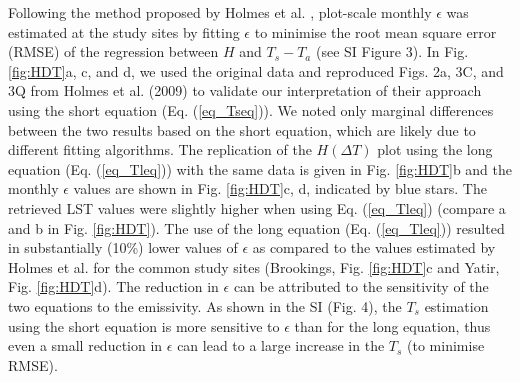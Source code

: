 \documentclass[fleqn,10pt]{wlscirep}
\begin{document}
Following the method proposed by Holmes et al. \cite{holmes2009land, holmes2016cloud}, plot-scale monthly $\epsilon$ was estimated at the study sites by fitting $\epsilon$ to minimise the root mean square error (RMSE) of the regression between $H$ and $T_s - T_a$ (see SI Figure 3). In Fig. \ref{fig:HDT}a, c, and d, we used the original data and reproduced Figs. 2a, 3C, and 3Q from Holmes et al. (2009) \cite{holmes2009land} to validate our interpretation of their approach using the short equation (Eq. (\ref{eq_Tseq})). We noted only marginal differences between the two results based on the short equation, which are likely due to different fitting algorithms. The replication of the $H (\Delta T)$ plot using the long equation (Eq. (\ref{eq_Tleq})) with the same data is given in Fig. \ref{fig:HDT}b and the monthly $\epsilon$ values are shown in Fig. \ref{fig:HDT}c, d, indicated by blue stars. The retrieved LST values were slightly higher when using Eq. (\ref{eq_Tleq}) (compare a and b in Fig. \ref{fig:HDT}). The use of the long equation (Eq. (\ref{eq_Tleq})) resulted in substantially (10\%) lower values of $\epsilon$ as compared to the values estimated by Holmes et al.\cite{holmes2009land} for the common study sites (Brookings, Fig. \ref{fig:HDT}c and Yatir, Fig. \ref{fig:HDT}d). The reduction in $\epsilon$ can be attributed to the sensitivity of the two equations to the emissivity. As  shown in the SI (Fig. 4), the $T_{s}$ estimation using the short equation is more sensitive to $\epsilon$ than for the long equation, thus even a small reduction in $\epsilon$ can lead to a large increase in the $T_{s}$ (to minimise RMSE). 
\end{document}
